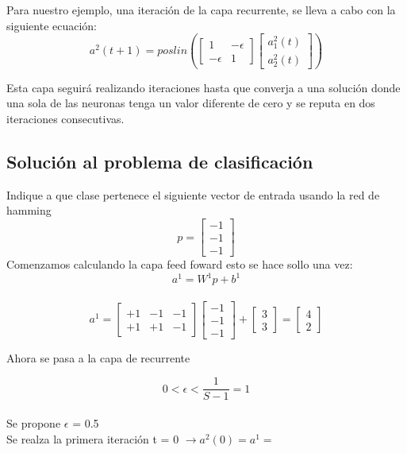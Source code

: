 \documentclass{article}
\begin{document}
Para nuestro ejemplo, una iteración de la capa recurrente, se lleva a cabo con la siguiente ecuación:\\

\[
a^2(t + 1) = poslin
(\begin{bmatrix}
1 & - \epsilon\\
-\epsilon & 1
\end{bmatrix}
\begin{bmatrix}
a_1^2(t)\\
a_2^2(t)
\end{bmatrix})
\]

Esta capa seguirá realizando iteraciones hasta que converja a una solución donde una sola de las neuronas tenga un valor diferente de cero y se reputa en dos iteraciones consecutivas.\\

\subsection{Solución al problema de clasificación}
Indique a que clase pertenece el siguiente vector de entrada usando la red de hamming\\

\[
p =
\begin{bmatrix}
-1 \\
-1\\
-1
\end{bmatrix}
\]
Comenzamos calculando la capa feed foward esto se hace sollo una vez:\\
$$ a^1 = W^1p + b^1 $$\\

\[
a^1 =
\begin{bmatrix}
+1 &  - 1& -1\\
+1 &  + 1& -1
\end{bmatrix}
\begin{bmatrix}
-1 \\
-1 \\
-1
\end{bmatrix}
+
\begin{bmatrix}
3 \\
3 
\end{bmatrix}
=
\begin{bmatrix}
4 \\
2 
\end{bmatrix}
\]

Ahora se pasa a la capa de recurrente

$$ 0 < \epsilon < \frac{1}{S - 1} = 1 $$\\
Se propone $\epsilon$ = 0.5\\
Se realza la primera iteración
t = 0 $\rightarrow a^2(0) = a^1 = $  
\end{document}
